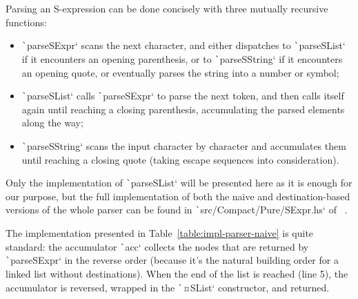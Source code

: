 \documentclass[english]{jflart}
\begin{document}
Parsing an S-expression can be done concisely with three mutually recursive functions:
\begin{itemize}
  \item \texttt`parseSExpr` scans the next character, and either dispatches to \texttt`parseSList` if it encounters an opening parenthesis, or to \texttt`parseSString` if it encounters an opening quote, or eventually parses the string into a number or symbol;
  \item \texttt`parseSList` calls \texttt`parseSExpr` to parse the next token, and then calls itself again until reaching a closing parenthesis, accumulating the parsed elements along the way;
  \item \texttt`parseSString` scans the input character by character and accumulates them until reaching a closing quote (taking escape sequences into consideration).
\end{itemize}

Only the implementation of \texttt`parseSList` will be presented here as it is enough for our purpose, but the full implementation of both the naive and destination-based versions of the whole parser can be found in \texttt`src/Compact/Pure/SExpr.hs` of~\cite{linear_dest} .

The implementation presented in Table~\ref{table:impl-parser-naive} is quite standard: the accumulator \texttt`acc` collects the nodes that are returned by \texttt`parseSExpr` in the reverse order (because it's the natural building order for a linked list without destinations). When the end of the list is reached (line 5), the accumulator is reversed, wrapped in the \texttt`¤SList` constructor, and returned.
\end{document}
